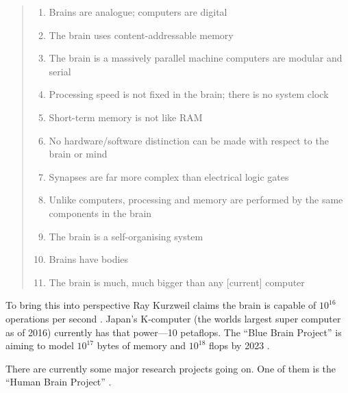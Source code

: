 \begin{quotation}
  \begin{enumerate}
    \item Brains are analogue; computers are digital
    \item The brain uses content-addressable memory
    \item The brain is a massively parallel machine computers are modular and serial
    \item Processing speed is not fixed in the brain; there is no system clock
    \item Short-term memory is not like RAM
    \item No hardware/software distinction can be made with respect to the brain or mind
    \item Synapses are far more complex than electrical logic gates
    \item Unlike computers, processing and memory are performed by the same components in the brain
    \item The brain is a self-organising system
    \item Brains have bodies
    \item	The brain is much, much bigger than any [current] computer
  \end{enumerate}
\end{quotation}

To bring this into perspective Ray Kurzweil claims the brain is capable of $10^16$ operations per second \citeyear[p.194]{Kurzweil2013}. Japan's K-computer (the worlds largest super computer as of 2016) currently has that power---10 petaflops. The ``Blue Brain Project'' is aiming to model $10^17$ bytes of memory and $10^18$ flops by 2023 \autocite[p.125]{Kurzweil2013}.

There are currently some major research projects going on. One of them is the ``Human Brain Project'' \autocite{Walker2012}.

